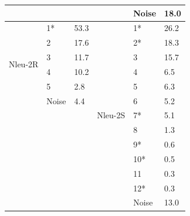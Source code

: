 \begin{table}[]
\begin{tabular}{c|ll||c|ll}
                          &         &             &                           & Noise   & 18.0        \\
\hline
\multirow{6}{*}{Nleu-2R}  & 1*      & 53.3        & \multirow{13}{*}{Nleu-2S} & 1*      & 26.2        \\
                          & 2       & 17.6        &                           & 2*      & 18.3        \\
                          & 3       & 11.7        &                           & 3       & 15.7        \\
                          & 4       & 10.2        &                           & 4       & 6.5         \\
                          & 5       & 2.8         &                           & 5       & 6.3         \\
                          & Noise   & 4.4         &                           & 6       & 5.2         \\
                          &         &             &                           & 7*      & 5.1         \\
                          &         &             &                           & 8       & 1.3         \\
                          &         &             &                           & 9*      & 0.6         \\
                          &         &             &                           & 10*     & 0.5         \\
                          &         &             &                           & 11      & 0.3         \\
                          &         &             &                           & 12*     & 0.3         \\
                          &         &             &                           & Noise   & 13.0       
\end{tabular}%
\end{table}

